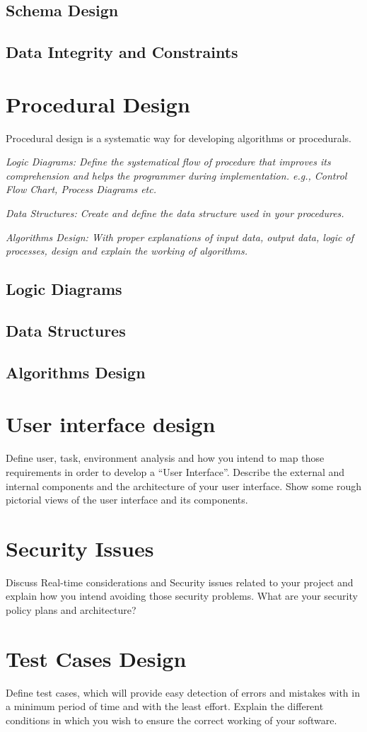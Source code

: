 \subsection{Schema Design}

\subsection{Data Integrity and Constraints}

\section{Procedural Design}
Procedural design is a systematic way for developing algorithms or procedurals.

\textit{Logic Diagrams: Define the systematical flow of procedure that improves its comprehension and helps the programmer during implementation. e.g., Control Flow Chart, Process Diagrams etc.}

\textit{Data Structures: Create and define the data structure used in your procedures.}

\textit{Algorithms Design: With proper explanations of input data, output data, logic of processes, design and explain the working of algorithms.}

\subsection{Logic Diagrams}

\subsection{Data Structures}

\subsection{Algorithms Design}

\section{User interface design}
Define user, task, environment analysis and how you intend to map those requirements in order to develop a “User Interface”. Describe the external and internal components and the architecture of your user interface. Show some rough pictorial views of the user interface and its components.

\section{Security Issues}
Discuss Real-time considerations and Security issues related to your project and explain how you intend avoiding those security problems. What are your security policy plans and architecture?

\section{Test Cases Design}
Define test cases, which will provide easy detection of errors and mistakes with in a minimum period of time and with the least effort. Explain the different conditions in which you wish to ensure the correct working of your software.